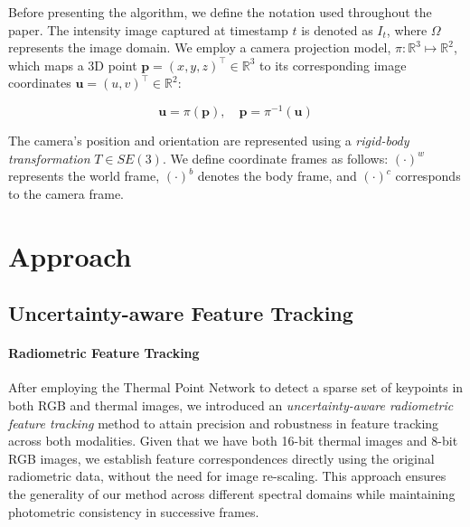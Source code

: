 Before presenting the algorithm, we define the notation used throughout the paper. The intensity image captured at timestamp $t$ is denoted as $I_t$, where $\Omega$ represents the image domain. We employ a camera projection model, $\pi: \mathbb{R}^3 \mapsto \mathbb{R}^2$, which maps a 3D point $\mathbf{p} = (x, y, z)^{\top} \in \mathbb{R}^3$ to its corresponding image coordinates $\mathbf{u} = (u,v)^{\top} \in \mathbb{R}^2$:  

\begin{equation}
\mathbf{u} = \pi(\mathbf{p}), \quad \mathbf{p} = \pi^{-1}(\mathbf{u})
\end{equation}  

The camera's position and orientation are represented using a \textit{rigid-body transformation} $T \in SE(3)$. We define coordinate frames as follows: $(\cdot)^w$ represents the world frame, $(\cdot)^b$ denotes the body frame, and $(\cdot)^c$ corresponds to the camera frame.


\section{Approach}
\subsection{Uncertainty-aware Feature Tracking}





\label{sec:algorithm:A}

\paragraph{\textbf{Radiometric Feature Tracking}} After employing the Thermal Point Network\cite{TP-TIO} to detect a sparse set of keypoints in both RGB and thermal images, we introduced an \textit{uncertainty-aware radiometric feature tracking} method to attain precision and robustness in feature tracking across both modalities.  Given that we have both 16-bit thermal images and 8-bit RGB images, we establish feature correspondences directly using the original radiometric data, without the need for image re-scaling. This approach ensures the generality of our method across different spectral domains while maintaining photometric consistency in successive frames.

